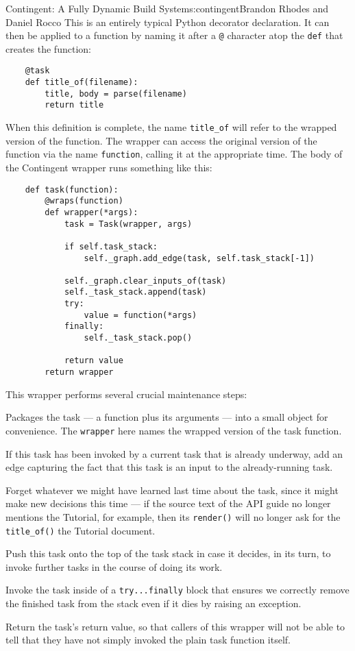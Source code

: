 \begin{aosachapter}{Contingent: A Fully Dynamic Build System}{s:contingent}{Brandon Rhodes and Daniel Rocco}
This is an entirely typical Python decorator declaration. It can then be
applied to a function by naming it after a \texttt{@} character atop the
\texttt{def} that creates the function:

\begin{verbatim}
    @task
    def title_of(filename):
        title, body = parse(filename)
        return title
\end{verbatim}

When this definition is complete, the name \texttt{title\_of} will refer
to the wrapped version of the function. The wrapper can access the
original version of the function via the name \texttt{function}, calling
it at the appropriate time. The body of the Contingent wrapper runs
something like this:

\begin{verbatim}
    def task(function):
        @wraps(function)
        def wrapper(*args):
            task = Task(wrapper, args)

            if self.task_stack:
                self._graph.add_edge(task, self.task_stack[-1])

            self._graph.clear_inputs_of(task)
            self._task_stack.append(task)
            try:
                value = function(*args)
            finally:
                self._task_stack.pop()

            return value
        return wrapper
\end{verbatim}

This wrapper performs several crucial maintenance steps:

\begin{aosaenumerate}
\def\labelenumi{\arabic{enumi}.}
\item
  Packages the task --- a function plus its arguments --- into a small
  object for convenience. The \texttt{wrapper} here names the wrapped
  version of the task function.
\item
  If this task has been invoked by a current task that is already
  underway, add an edge capturing the fact that this task is an input to
  the already-running task.
\item
  Forget whatever we might have learned last time about the task, since
  it might make new decisions this time --- if the source text of the
  API guide no longer mentions the Tutorial, for example, then its
  \texttt{render()} will no longer ask for the \texttt{title\_of()} the
  Tutorial document.
\item
  Push this task onto the top of the task stack in case it decides, in
  its turn, to invoke further tasks in the course of doing its work.
\item
  Invoke the task inside of a \texttt{try...finally} block that ensures
  we correctly remove the finished task from the stack even if it dies
  by raising an exception.
\item
  Return the task's return value, so that callers of this wrapper will
  not be able to tell that they have not simply invoked the plain task
  function itself.
\end{aosaenumerate}


\end{aosachapter}
